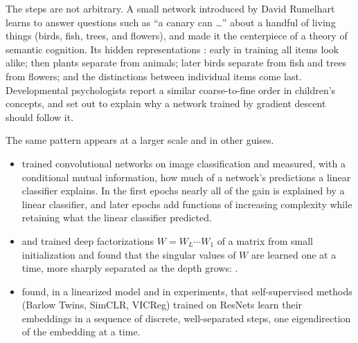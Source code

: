 \begin{refsection}
The steps are not arbitrary. A small network introduced by David Rumelhart learns to answer questions such as ``a canary can \dots'' about a handful of living things (birds, fish, trees, and flowers), and \textcite{RogersMcClelland2004} made it the centerpiece of a theory of semantic cognition. Its hidden representations : early in training all items look alike; then plants separate from animals; later birds separate from fish and trees from flowers; and the distinctions between individual items come last. Developmental psychologists report a similar coarse-to-fine order in children's concepts, and \textcite{SaxeEtAl2019} set out to explain why a network trained by gradient descent should follow it.

The same pattern appears at a larger scale and in other guises.
\begin{itemize}
\item \Textcite{KalimerisEtAl2019} trained convolutional networks on image classification and measured, with a conditional mutual information, how much of a network's predictions a linear classifier explains. In the first epochs nearly all of the gain is explained by a linear classifier, and later epochs add functions of increasing complexity while retaining what the linear classifier predicted.
\item \Textcite{AroraEtAl2019} and \textcite{GissinEtAl2020} trained deep factorizations $W=W_L\cdots W_1$ of a matrix from small initialization and found that the singular values of $W$ are learned one at a time, more sharply separated as the depth grows: .
\item \Textcite{SimonEtAl2023} found, in a linearized model and in experiments, that self-supervised methods (Barlow Twins, SimCLR, VICReg) trained on ResNets learn their embeddings in a sequence of discrete, well-separated steps, one eigendirection of the embedding at a time.
\end{itemize}



\end{refsection}

